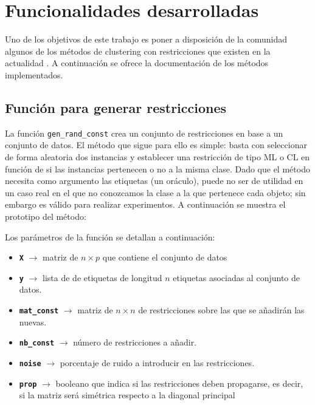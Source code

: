 \section{Funcionalidades desarrolladas}

Uno de los objetivos de este trabajo es poner a disposición de la comunidad algunos de los métodos de clustering con restricciones que existen en la actualidad \cite{MetodosPython}. A continuación se ofrece la documentación de los métodos implementados.

\subsection{Función para generar restricciones} \label{genConst}

La función \texttt{gen\_rand\_const} crea un conjunto de restricciones en base a un conjunto de datos. El método que sigue para ello es simple: basta con seleccionar de forma aleatoria dos instancias y establecer una restricción de tipo \acs{ML} o \acs{CL} en función de si las instancias pertenecen o no a la misma clase. Dado que el método necesita como argumento las etiquetas (un oráculo), puede no ser de utilidad en un caso real en el que no conozcamos la clase a la que pertenece cada objeto; sin embargo es válido para realizar experimentos. A continuación se muestra el prototipo del método:



Los parámetros de la función se detallan a continuación:

\begin{itemize}

	\item \textbf{\texttt{X}} {$\longrightarrow$ matriz de $n \times p$ que contiene el conjunto de datos}
	
	\item \textbf{\texttt{y}} {$\longrightarrow$ lista de de etiquetas de longitud $n$ etiquetas asociadas al conjunto de datos.}
	
	\item \textbf{\texttt{mat\_const}} {$\longrightarrow$ matriz de $n \times n$ de restricciones sobre las que se añadirán las nuevas.}
	
	\item \textbf{\texttt{nb\_const}} {$\longrightarrow$ número de restricciones a añadir.}
	
	\item \textbf{\texttt{noise}} {$\longrightarrow$ porcentaje de ruido a introducir en las restricciones.}
	
	\item \textbf{\texttt{prop}} {$\longrightarrow$ booleano que indica si las restricciones deben propagarse, es decir, si la matriz será simétrica respecto a la diagonal principal}

\end{itemize}

